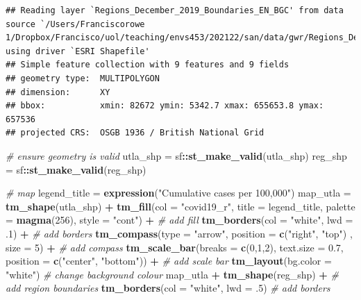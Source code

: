 \documentclass[
]{book}
\newenvironment{Shaded}{\begin{snugshade}}{\end{snugshade}}
\newcommand{\CommentTok}[1]{\textcolor[rgb]{0.56,0.35,0.01}{\textit{#1}}}
\newcommand{\DataTypeTok}[1]{\textcolor[rgb]{0.13,0.29,0.53}{#1}}
\newcommand{\DecValTok}[1]{\textcolor[rgb]{0.00,0.00,0.81}{#1}}
\newcommand{\FloatTok}[1]{\textcolor[rgb]{0.00,0.00,0.81}{#1}}
\newcommand{\KeywordTok}[1]{\textcolor[rgb]{0.13,0.29,0.53}{\textbf{#1}}}
\newcommand{\NormalTok}[1]{#1}
\newcommand{\OperatorTok}[1]{\textcolor[rgb]{0.81,0.36,0.00}{\textbf{#1}}}
\newcommand{\StringTok}[1]{\textcolor[rgb]{0.31,0.60,0.02}{#1}}
\begin{document}
\begin{verbatim}
## Reading layer `Regions_December_2019_Boundaries_EN_BGC' from data source `/Users/Franciscorowe 1/Dropbox/Francisco/uol/teaching/envs453/202122/san/data/gwr/Regions_December_2019_Boundaries_EN_BGC.shp' using driver `ESRI Shapefile'
## Simple feature collection with 9 features and 9 fields
## geometry type:  MULTIPOLYGON
## dimension:      XY
## bbox:           xmin: 82672 ymin: 5342.7 xmax: 655653.8 ymax: 657536
## projected CRS:  OSGB 1936 / British National Grid
\end{verbatim}

\begin{Shaded}
\begin{Highlighting}[]
\CommentTok{# ensure geometry is valid}
\NormalTok{utla_shp =}\StringTok{ }\NormalTok{sf}\OperatorTok{::}\KeywordTok{st_make_valid}\NormalTok{(utla_shp)}
\NormalTok{reg_shp =}\StringTok{ }\NormalTok{sf}\OperatorTok{::}\KeywordTok{st_make_valid}\NormalTok{(reg_shp)}

\CommentTok{# map}
\NormalTok{legend_title =}\StringTok{ }\KeywordTok{expression}\NormalTok{(}\StringTok{"Cumulative cases per 100,000"}\NormalTok{)}
\NormalTok{map_utla =}\StringTok{ }\KeywordTok{tm_shape}\NormalTok{(utla_shp) }\OperatorTok{+}
\StringTok{  }\KeywordTok{tm_fill}\NormalTok{(}\DataTypeTok{col =} \StringTok{"covid19_r"}\NormalTok{, }\DataTypeTok{title =}\NormalTok{ legend_title, }\DataTypeTok{palette =} \KeywordTok{magma}\NormalTok{(}\DecValTok{256}\NormalTok{), }\DataTypeTok{style =} \StringTok{"cont"}\NormalTok{) }\OperatorTok{+}\StringTok{ }\CommentTok{# add fill}
\StringTok{  }\KeywordTok{tm_borders}\NormalTok{(}\DataTypeTok{col =} \StringTok{"white"}\NormalTok{, }\DataTypeTok{lwd =} \FloatTok{.1}\NormalTok{)  }\OperatorTok{+}\StringTok{ }\CommentTok{# add borders}
\StringTok{  }\KeywordTok{tm_compass}\NormalTok{(}\DataTypeTok{type =} \StringTok{"arrow"}\NormalTok{, }\DataTypeTok{position =} \KeywordTok{c}\NormalTok{(}\StringTok{"right"}\NormalTok{, }\StringTok{"top"}\NormalTok{) , }\DataTypeTok{size =} \DecValTok{5}\NormalTok{) }\OperatorTok{+}\StringTok{ }\CommentTok{# add compass}
\StringTok{  }\KeywordTok{tm_scale_bar}\NormalTok{(}\DataTypeTok{breaks =} \KeywordTok{c}\NormalTok{(}\DecValTok{0}\NormalTok{,}\DecValTok{1}\NormalTok{,}\DecValTok{2}\NormalTok{), }\DataTypeTok{text.size =} \FloatTok{0.7}\NormalTok{, }\DataTypeTok{position =}  \KeywordTok{c}\NormalTok{(}\StringTok{"center"}\NormalTok{, }\StringTok{"bottom"}\NormalTok{)) }\OperatorTok{+}\StringTok{ }\CommentTok{# add scale bar}
\StringTok{  }\KeywordTok{tm_layout}\NormalTok{(}\DataTypeTok{bg.color =} \StringTok{"white"}\NormalTok{) }\CommentTok{# change background colour}
\NormalTok{map_utla }\OperatorTok{+}\StringTok{ }\KeywordTok{tm_shape}\NormalTok{(reg_shp) }\OperatorTok{+}\StringTok{ }\CommentTok{# add region boundaries}
\StringTok{  }\KeywordTok{tm_borders}\NormalTok{(}\DataTypeTok{col =} \StringTok{"white"}\NormalTok{, }\DataTypeTok{lwd =} \FloatTok{.5}\NormalTok{) }\CommentTok{# add borders}
\end{Highlighting}
\end{Shaded}
\end{document}
